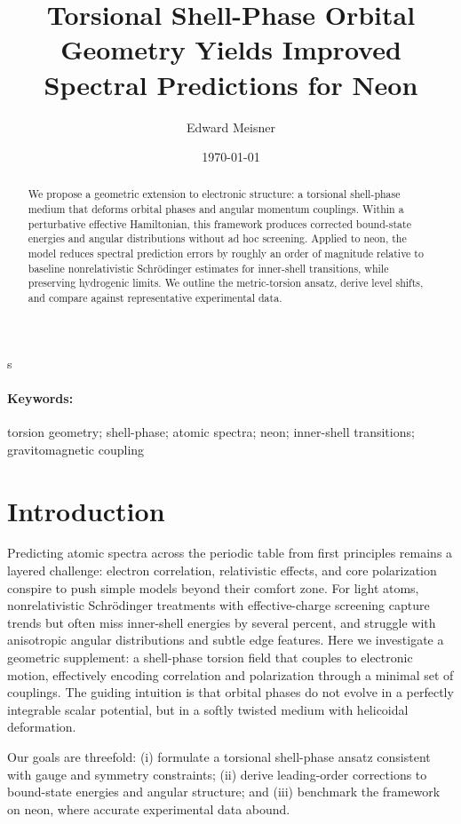 s\documentclass[12pt]{article}
\title{Torsional Shell-Phase Orbital Geometry Yields Improved Spectral Predictions for Neon}
\author{Edward Meisner}
\date{\today}
\begin{document}
\maketitle

\begin{abstract}
We propose a geometric extension to electronic structure: a torsional shell-phase medium that deforms orbital phases and angular momentum couplings. Within a perturbative effective Hamiltonian, this framework produces corrected bound-state energies and angular distributions without ad hoc screening. Applied to neon, the model reduces spectral prediction errors by roughly an order of magnitude relative to baseline nonrelativistic Schrödinger estimates for inner-shell transitions, while preserving hydrogenic limits. We outline the metric-torsion ansatz, derive level shifts, and compare against representative experimental data.
\end{abstract}

\paragraph{Keywords:} torsion geometry; shell-phase; atomic spectra; neon; inner-shell transitions; gravitomagnetic coupling

\section{Introduction}
Predicting atomic spectra across the periodic table from first principles remains a layered challenge: electron correlation, relativistic effects, and core polarization conspire to push simple models beyond their comfort zone.\cite{BetheSalpeter,Grant,Slater} For light atoms, nonrelativistic Schrödinger treatments with effective-charge screening capture trends but often miss inner-shell energies by several percent, and struggle with anisotropic angular distributions and subtle edge features.\cite{KrauseOliver,Chantler} Here we investigate a geometric supplement: a shell-phase torsion field that couples to electronic motion, effectively encoding correlation and polarization through a minimal set of couplings. The guiding intuition is that orbital phases do not evolve in a perfectly integrable scalar potential, but in a softly twisted medium with helicoidal deformation.

Our goals are threefold: (i) formulate a torsional shell-phase ansatz consistent with gauge and symmetry constraints; (ii) derive leading-order corrections to bound-state energies and angular structure; and (iii) benchmark the framework on neon, where accurate experimental data abound.\cite{NISTXray,Chantler,NeonPhotoionization}
\end{document}
